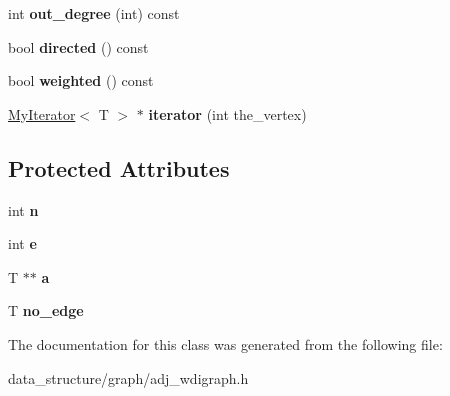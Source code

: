 \begin{DoxyCompactItemize}
int {\bfseries out\+\_\+degree} (int) const
\item 
\mbox{\label{classAdjacencyWDigraph_a7a7de2aac4ae34a5a8cbe9c592faed59}} 
bool {\bfseries directed} () const
\item 
\mbox{\label{classAdjacencyWDigraph_a6f9db4aec4cefb4c07f6fb26a5ab9c65}} 
bool {\bfseries weighted} () const
\item 
\mbox{\label{classAdjacencyWDigraph_af9cb59bd782511466f82a011b4f5ad73}} 
\hyperlink{classMyIterator}{My\+Iterator}$<$ T $>$ $\ast$ {\bfseries iterator} (int the\+\_\+vertex)
\end{DoxyCompactItemize}
\subsection*{Protected Attributes}
\begin{DoxyCompactItemize}
\item 
\mbox{\label{classAdjacencyWDigraph_a37b4dab62f983a0848c62ee4d3b76ee3}} 
int {\bfseries n}
\item 
\mbox{\label{classAdjacencyWDigraph_a864817f005e567120b21ed296ab56819}} 
int {\bfseries e}
\item 
\mbox{\label{classAdjacencyWDigraph_a7da8b19b024f300504cc2201bc7a0aae}} 
T $\ast$$\ast$ {\bfseries a}
\item 
\mbox{\label{classAdjacencyWDigraph_accd1b00deb25b12bb7bf5d57e53218e9}} 
T {\bfseries no\+\_\+edge}
\end{DoxyCompactItemize}


The documentation for this class was generated from the following file\+:\begin{DoxyCompactItemize}
\item 
data\+\_\+structure/graph/adj\+\_\+wdigraph.\+h\end{DoxyCompactItemize}
